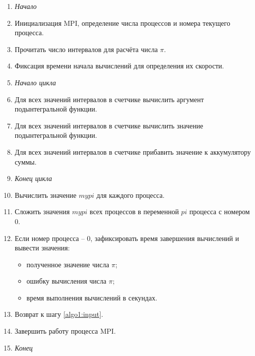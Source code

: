 \documentclass{altsu-bachelor}
\begin{document}
\begin{enumerate}
    \item \textit{Начало}
    
    \item Инициализация MPI, определение числа процессов и номера текущего процесса.
    
    \item \label{algo1:input}Прочитать число интервалов для расчёта числа $\pi$.
    
    \item Фиксация времени начала вычислений для определения их скорости.

    \item \textit{Начало цикла}
    
    \item Для всех значений интервалов в счетчике вычислить аргумент подынтегральной функции.
    
    \item Для всех значений интервалов в счетчике вычислить значение подынтегральной функции.
    
    \item Для всех значений интервалов в счетчике прибавить значение к аккумулятору суммы.

    \item \textit{Конец цикла}
    
    \item Вычислить значение $mypi$ для каждого процесса.
    
    \item Сложить значения $mypi$ всех процессов в переменной $pi$ процесса с номером 0.
    
    \item Если номер процесса -- 0, зафиксировать время завершения вычислений и вывести значения:
    
    \begin{itemize}
        \item полученное значение числа $\pi$;
    
        \item ошибку вычисления числа $\pi$;
        
        \item время выполнения вычислений в секундах.
    \end{itemize}
    
    \item Возврат к шагу \ref{algo1:input}.
    
    \item Завершить работу процесса MPI.
    
    \item \textit{Конец}
\end{enumerate}
\end{document}
